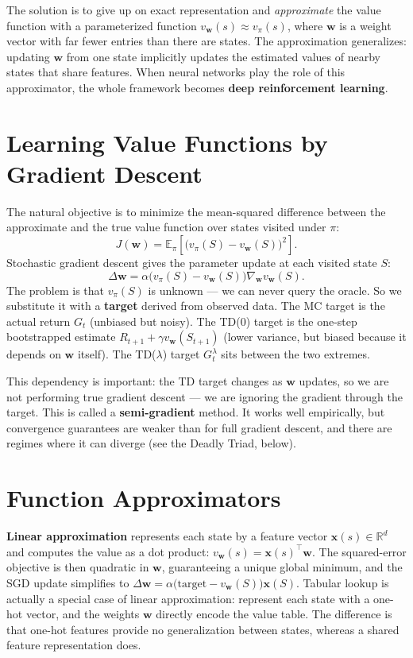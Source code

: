 \documentclass[11pt, oneside]{book}
\newcommand{\E}{\mathbb{E}}              %
\newcommand{\vpi}{v_{\pi}}               %
\begin{document}
The solution is to give up on exact representation and \emph{approximate}
the value function with a parameterized function $v_\mathbf{w}(s) \approx \vpi(s)$,
where $\mathbf{w}$ is a weight vector with far fewer entries than there are states.
The approximation generalizes: updating $\mathbf{w}$ from one state implicitly
updates the estimated values of nearby states that share features.
When neural networks play the role of this approximator, the whole framework
becomes \textbf{deep reinforcement learning}.

\section{Learning Value Functions by Gradient Descent}

The natural objective is to minimize the mean-squared difference between the
approximate and the true value function over states visited under $\pi$:
\[
  J(\mathbf{w}) = \E_\pi\!\left[\bigl(\vpi(S) - v_\mathbf{w}(S)\bigr)^2\right].
\]
Stochastic gradient descent gives the parameter update at each visited state $S$:
\[
  \Delta\mathbf{w} = \alpha\bigl(\vpi(S) - v_\mathbf{w}(S)\bigr)\nabla_\mathbf{w} v_\mathbf{w}(S).
\]
The problem is that $\vpi(S)$ is unknown --- we can never query the oracle.
So we substitute it with a \textbf{target} derived from observed data.
The MC target is the actual return $G_t$ (unbiased but noisy).
The TD(0) target is the one-step bootstrapped estimate $R_{t+1} + \gamma v_\mathbf{w}(S_{t+1})$
(lower variance, but biased because it depends on $\mathbf{w}$ itself).
The TD($\lambda$) target $G_t^\lambda$ sits between the two extremes.

This dependency is important: the TD target changes as $\mathbf{w}$ updates, so
we are not performing true gradient descent --- we are ignoring the gradient
through the target.
This is called a \textbf{semi-gradient} method.
It works well empirically, but convergence guarantees are weaker than for full
gradient descent, and there are regimes where it can diverge
(see the Deadly Triad, below).

\section{Function Approximators}

\textbf{Linear approximation} represents each state by a feature vector
$\mathbf{x}(s) \in \mathbb{R}^d$ and computes the value as a dot product:
$v_\mathbf{w}(s) = \mathbf{x}(s)^\top \mathbf{w}$.
The squared-error objective is then quadratic in $\mathbf{w}$, guaranteeing a
unique global minimum, and the SGD update simplifies to
$\Delta\mathbf{w} = \alpha\bigl(\text{target} - v_\mathbf{w}(S)\bigr)\mathbf{x}(S)$.
Tabular lookup is actually a special case of linear approximation: represent each
state with a one-hot vector, and the weights $\mathbf{w}$ directly encode the value
table.
The difference is that one-hot features provide no generalization between states,
whereas a shared feature representation does.
\end{document}

